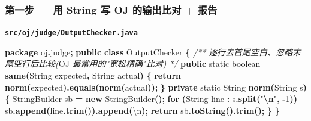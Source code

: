 \documentclass[
  11pt,
]{ctexart}
\newenvironment{Shaded}{\begin{snugshade}}{\end{snugshade}}
\newcommand{\BuiltInTok}[1]{#1}
\newcommand{\CharTok}[1]{\textcolor[rgb]{0.31,0.60,0.02}{#1}}
\newcommand{\CommentTok}[1]{\textcolor[rgb]{0.56,0.35,0.01}{\textit{#1}}}
\newcommand{\ControlFlowTok}[1]{\textcolor[rgb]{0.13,0.29,0.53}{\textbf{#1}}}
\newcommand{\DataTypeTok}[1]{\textcolor[rgb]{0.13,0.29,0.53}{#1}}
\newcommand{\DecValTok}[1]{\textcolor[rgb]{0.00,0.00,0.81}{#1}}
\newcommand{\FunctionTok}[1]{\textcolor[rgb]{0.13,0.29,0.53}{\textbf{#1}}}
\newcommand{\ImportTok}[1]{#1}
\newcommand{\KeywordTok}[1]{\textcolor[rgb]{0.13,0.29,0.53}{\textbf{#1}}}
\newcommand{\NormalTok}[1]{#1}
\newcommand{\OperatorTok}[1]{\textcolor[rgb]{0.81,0.36,0.00}{\textbf{#1}}}
\newcommand{\SpecialCharTok}[1]{\textcolor[rgb]{0.81,0.36,0.00}{\textbf{#1}}}
\newcommand{\StringTok}[1]{\textcolor[rgb]{0.31,0.60,0.02}{#1}}
\begin{document}
\hypertarget{ux7b2cux4e00ux6b65-ux7528-string-ux5199-oj-ux7684ux8f93ux51faux6bd4ux5bf9-ux62a5ux544a}{%
\subsubsection{\texorpdfstring{第一步 \KS --- 用 String 写 OJ 的输出比对
+
报告}{第一步 --- 用 String 写 OJ 的输出比对 + 报告}}\label{ux7b2cux4e00ux6b65-ux7528-string-ux5199-oj-ux7684ux8f93ux51faux6bd4ux5bf9-ux62a5ux544a}}

\textbf{\texttt{src/oj/judge/OutputChecker.java}}

\begin{Shaded}
\begin{Highlighting}[]
\KeywordTok{package}\ImportTok{ oj}\OperatorTok{.}\ImportTok{judge}\OperatorTok{;}
\KeywordTok{public} \KeywordTok{class}\NormalTok{ OutputChecker }\OperatorTok{\{}
    \CommentTok{/**} \CommentTok{逐行去首尾空白、忽略末尾空行后比较(}\NormalTok{OJ }\CommentTok{最常用的"宽松精确"比对)} \CommentTok{*/}
    \KeywordTok{public} \DataTypeTok{static} \DataTypeTok{boolean} \FunctionTok{same}\OperatorTok{(}\BuiltInTok{String}\NormalTok{ expected}\OperatorTok{,} \BuiltInTok{String}\NormalTok{ actual}\OperatorTok{)} \OperatorTok{\{}
        \ControlFlowTok{return} \FunctionTok{norm}\OperatorTok{(}\NormalTok{expected}\OperatorTok{).}\FunctionTok{equals}\OperatorTok{(}\FunctionTok{norm}\OperatorTok{(}\NormalTok{actual}\OperatorTok{));}
    \OperatorTok{\}}
    \KeywordTok{private} \DataTypeTok{static} \BuiltInTok{String} \FunctionTok{norm}\OperatorTok{(}\BuiltInTok{String}\NormalTok{ s}\OperatorTok{)} \OperatorTok{\{}
        \BuiltInTok{StringBuilder}\NormalTok{ sb }\OperatorTok{=} \KeywordTok{new} \BuiltInTok{StringBuilder}\OperatorTok{();}
        \ControlFlowTok{for} \OperatorTok{(}\BuiltInTok{String}\NormalTok{ line }\OperatorTok{:}\NormalTok{ s}\OperatorTok{.}\FunctionTok{split}\OperatorTok{(}\StringTok{"}\SpecialCharTok{\textbackslash{}n}\StringTok{"}\OperatorTok{,} \OperatorTok{{-}}\DecValTok{1}\OperatorTok{))}\NormalTok{ sb}\OperatorTok{.}\FunctionTok{append}\OperatorTok{(}\NormalTok{line}\OperatorTok{.}\FunctionTok{trim}\OperatorTok{()).}\FunctionTok{append}\OperatorTok{(}\CharTok{\textquotesingle{}\textbackslash{}n\textquotesingle{}}\OperatorTok{);}
        \ControlFlowTok{return}\NormalTok{ sb}\OperatorTok{.}\FunctionTok{toString}\OperatorTok{().}\FunctionTok{trim}\OperatorTok{();}
    \OperatorTok{\}}
\OperatorTok{\}}
\end{Highlighting}
\end{Shaded}
\end{document}
